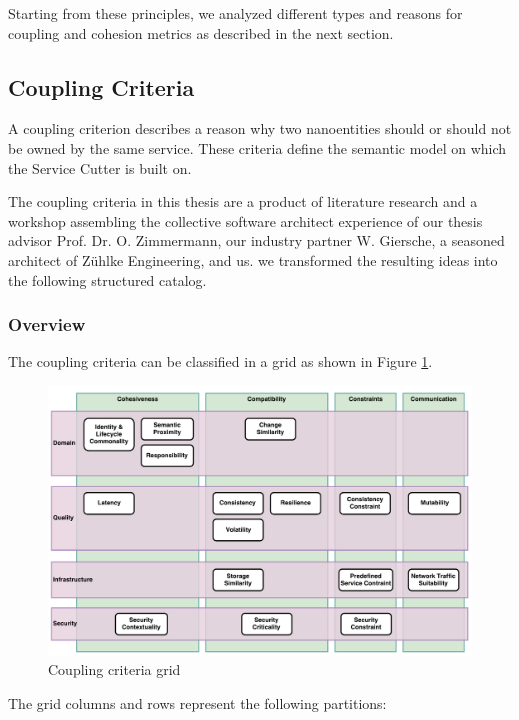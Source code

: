 Starting from these principles, we analyzed different types and reasons for coupling and cohesion metrics as described in the next section.

\subsection{Coupling Criteria}
\label{sec:couplingCriteria}

A coupling criterion describes a reason why two nanoentities should or should not be owned by the same service. These criteria define the semantic model on which the Service Cutter is built on. 

The coupling criteria in this thesis are a product of literature research and a workshop assembling the collective software architect experience of our thesis advisor Prof. Dr. O. Zimmermann, our industry partner W. Giersche, a seasoned architect of Zühlke Engineering, and us. we transformed the resulting ideas into the following structured catalog.

\subsubsection{Overview}

The coupling criteria can be classified in a grid as shown in Figure \ref{fig:cc_grid}.

\begin{figure}[H]
	\includegraphics[scale=0.5]{diagrams/CouplingCatalog.pdf}
	\caption{Coupling criteria grid}
	\label{fig:cc_grid}
\end{figure}

The grid columns and rows represent the following partitions:

